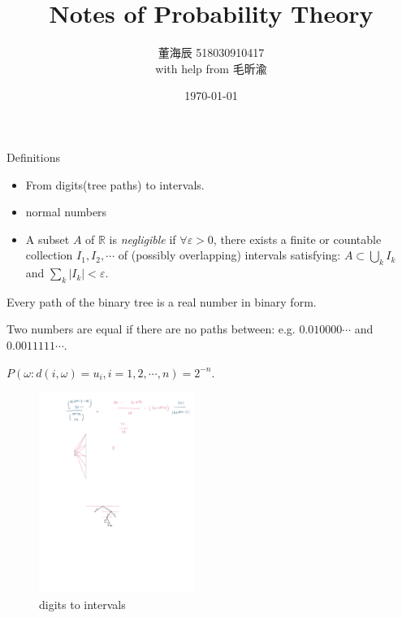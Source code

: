
% 

\title{Notes of Probability Theory}
\date{\today}
\author{董海辰 518030910417\\{\normalsize with help from 毛昕渝}}


\maketitle

\begin{thm}{Definitions}{}
    \begin{itemize}
        \item From digits(tree paths) to intervals.
        \item normal numbers
    \item A subset $A$ of $\mathbb{R} $ is \textit{negligible} if $\forall \varepsilon >0$, there exists a finite or countable collection $I_1, I_2, \cdots $ of (possibly overlapping) intervals satisfying: $A \subset \bigcup_k I_k$ and $\sum _k|I_k| < \varepsilon $.
    \end{itemize}
\end{thm}

Every path of the binary tree is a real number in binary form.

Two numbers are equal if there are no paths between: e.g. $0.010000\cdots $ and $0.0011111\cdots $.

$P(\omega : d(i,\omega ) = u_i, i = 1,2,\cdots ,n) = 2^{-n}$.

\begin{figure}[h!]
    \centering
    \includegraphics[width=0.45\textwidth]{w1fig.pdf}
    \caption{digits to intervals}
\end{figure}

